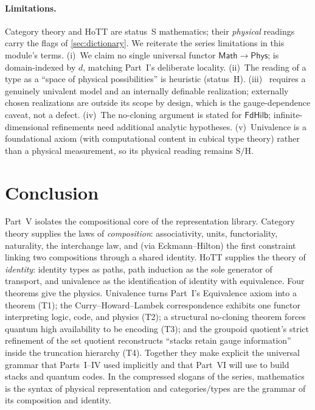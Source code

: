 \documentclass[12pt]{article}
\theoremstyle{definition}
\theoremstyle{remark}
\newcommand{\Phys}{\mathsf{Phys}}
\newcommand{\Math}{\mathsf{Math}}
\newcommand{\FdHilb}{\mathsf{FdHilb}}
\begin{document}
\paragraph{Limitations.}
Category theory and HoTT are status~S mathematics; their \emph{physical} readings
carry the flags of \cref{sec:dictionary}. We reiterate the series limitations in
this module's terms. (i)~We claim no single universal functor $\Math\to\Phys$;
 is domain-indexed by $d$, matching Part~I's
deliberate locality. (ii)~The reading of a type as a ``space of physical
possibilities'' is heuristic (status~$\mathrm{H}$). (iii)~
requires a genuinely univalent model and an internally definable realization;
externally chosen realizations are outside its scope by design, which is the
gauge-dependence caveat, not a defect. (iv)~The no-cloning argument is stated for
$\FdHilb$; infinite-dimensional refinements need additional analytic hypotheses.
(v)~Univalence is a foundational axiom (with computational content in cubical
type theory) rather than a physical measurement, so its physical reading remains
$\mathrm{S/H}$.

\section{Conclusion}
\label{sec:conclusion}

Part~V isolates the compositional core of the representation library. Category
theory supplies the laws of \emph{composition}: associativity, units,
functoriality, naturality, the interchange law, and (via Eckmann--Hilton) the
first constraint linking two compositions through a shared identity. HoTT
supplies the theory of \emph{identity}: identity types as paths, path induction
as the sole generator of transport, and univalence as the identification of
identity with equivalence. Four theorems give the physics. Univalence turns
Part~I's Equivalence axiom into a theorem (T1); the Curry--Howard--Lambek
correspondence exhibits one functor interpreting logic, code, and physics (T2); a
structural no-cloning theorem forces quantum high availability to be encoding
(T3); and the groupoid quotient's strict refinement of the set quotient
reconstructs ``stacks retain gauge information'' inside the truncation hierarchy
(T4). Together they make explicit the universal grammar that Parts~I--IV used
implicitly and that Part~VI will use to build stacks and quantum codes. In the
compressed slogans of the series, mathematics is the syntax of physical
representation and categories/types are the grammar of its composition and
identity.
\end{document}
